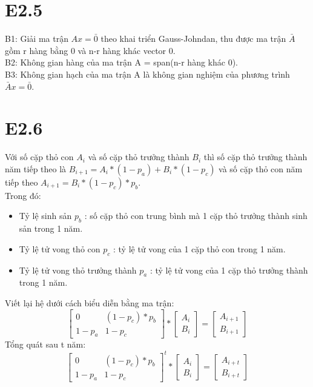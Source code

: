 \documentclass[a4paper,11pt]{article}
\theoremstyle{mytheor}
\begin{document}
\section*{E2.5}
B1: Giải ma trận $Ax=\bar{0}$ theo khai triển Gauss-Johndan, thu được ma trận $\bar{A}$ gồm r hàng bằng 0 và n-r hàng khác vector 0.\\
B2: Không gian hàng của ma trận A = span(n-r hàng khác 0).\\
B3: Không gian hạch của ma trận A là không gian nghiệm của phương trình $\bar{A}x=\bar{0}$.
\section*{E2.6}
Với số cặp thỏ con $A_i$ và số cặp thỏ trưởng thành $B_i$ thì số cặp thỏ trưởng thành năm tiếp theo là $B_{i+1}= A_i*(1-p_a)+B_i*(1-p_c)$ và số cặp thỏ con năm tiếp theo $A_{i+1} = B_i*(1-p_c)*p_b$.\\
Trong đó:
\begin{itemize}
\item Tỷ lệ sinh sản $p_b$ : số cặp thỏ con trung bình mà 1 cặp thỏ trưởng thành sinh sản trong 1 năm.
\item Tỷ lệ tử vong thỏ con $p_c$ : tỷ lệ tử vong của 1 cặp thỏ con trong 1 năm.
\item Tỷ lệ tử vong thỏ trưởng thành $p_a$ : tỷ lệ tử vong của 1 cặp thỏ trưởng thành trong 1 năm.
\end{itemize}
Viết lại hệ dưới cách biểu diễn bằng ma trận:\\
$$
    \begin{bmatrix}0&(1-p_c)*p_b\\ 1-p_a & 1-p_c \end{bmatrix} * \begin{bmatrix}A_i\\B_i\end{bmatrix} = \begin{bmatrix}A_{i+1}\\B_{i+1}\end{bmatrix}
$$
Tổng quát sau t năm:
$$
    \begin{bmatrix}0&(1-p_c)*p_b\\ 1-p_a & 1-p_c \end{bmatrix}^t * \begin{bmatrix}A_i\\B_i\end{bmatrix} = \begin{bmatrix}A_{i+t}\\B_{i+t}\end{bmatrix}
$$
\end{document}
